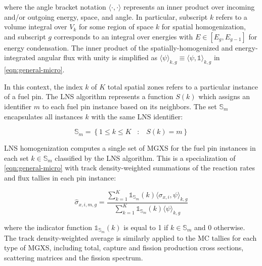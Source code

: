 \noindent where the angle bracket notation $\langle \cdot , \cdot \rangle$ represents an inner product over incoming and/or outgoing energy, space, and angle. In particular, subscript $k$ refers to a volume integral over $V_{k}$ for some region of space $k$ for spatial homogenization, and subscript $g$ corresponds to an integral over energies with $E \in [E_{g}, E_{g-1}]$ for energy condensation. The inner product of the spatially-homogenized and energy-integrated angular flux with unity is simplified as $\langle \psi \rangle_{k,g} \equiv \langle \psi, \mathbb{1} \rangle_{k,g}$ in \autoref{eqn:general-micro}.

In this context, the index $k$ of $K$ total spatial zones refers to a particular instance of a fuel pin. The LNS algorithm represents a function $S(k)$ which assigns an identifier $m$ to each fuel pin instance based on its neighbors. The set $\mathbb{S}_{m}$ encapsulates all instances $k$ with the same LNS identifier:

\begin{equation}
\label{eqn:lns-set}
\mathbb{S}_{m} = \left\{1 \le k \le K \;\;\; : \;\;\; S(k) = m\right\}
\end{equation}

LNS homogenization computes a single set of MGXS for the fuel pin instances in each set $k \in \mathbb{S}_{m}$ classified by the LNS algorithm. This is a specialization of \autoref{eqn:general-micro} with track density-weighted summations of the reaction rates and flux tallies in each pin instance:

\begin{equation}
\label{eqn:lns-micro}
\hat{\sigma}_{x,i,m,g} = \frac{\displaystyle\sum\limits_{k=1}^{K}\mathbb{1}_{\mathbb{S}_{m}}(k) \langle \sigma_{x,i}, \psi \rangle_{k,g}}{\displaystyle\sum\limits_{k=1}^{K}\mathbb{1}_{\mathbb{S}_{m}}(k) \langle \psi \rangle_{k,g}}
\end{equation}

\noindent where the indicator function $\mathbb{1}_{\mathbb{S}_{m}}(k)$ is equal to 1 if $k \in \mathbb{S}_{m}$ and 0 otherwise. The track density-weighted average is similarly applied to the MC tallies for each type of MGXS, including total, capture and fission production cross sections, scattering matrices and the fission spectrum.
